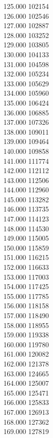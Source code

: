 { 125.000	102154 \\
 126.000	102546 \\
 127.000	102887 \\
 128.000	103252 \\
 129.000	103805 \\
 130.000	104133 \\
 131.000	104598 \\
 132.000	105234 \\
 133.000	105629 \\
 134.000	105960 \\
 135.000	106424 \\
 136.000	106885 \\
 137.000	107326 \\
 138.000	109011 \\
 139.000	109464 \\
 140.000	109858 \\
 141.000	111774 \\
 142.000	112112 \\
 143.000	112506 \\
 144.000	112960 \\
 145.000	113282 \\
 146.000	113735 \\
 147.000	114123 \\
 148.000	114530 \\
 149.000	115005 \\
 150.000	115859 \\
 151.000	116215 \\
 152.000	116633 \\
 153.000	117003 \\
 154.000	117425 \\
 155.000	117785 \\
 156.000	118158 \\
 157.000	118490 \\
 158.000	118955 \\
 159.000	119338 \\
 160.000	119780 \\
 161.000	120082 \\
 162.000	121378 \\
 163.000	124665 \\
 164.000	125007 \\
 165.000	125471 \\
 166.000	125833 \\
 167.000	126913 \\
 168.000	127362 \\
 169.000	127819 \\
}
